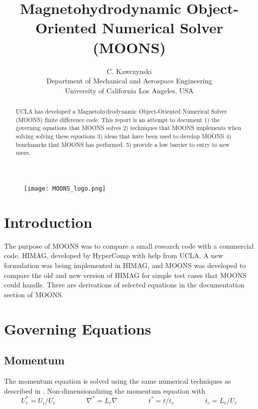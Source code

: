 \documentclass[11pt]{article}
\newcommand{\eqtab}{\;\;\;\;\;\;\;\;\;\;\;\;\;\;\;\;}
\begin{document}
\doublespacing
\begin{figure}
\centering
\texttt{[image: MOONS\_logo.png]}
\end{figure}
\title{Magnetohydrodynamic Object-Oriented Numerical Solver (MOONS)}
\author{C. Kawczynski \\
Department of Mechanical and Aerospace Engineering \\
University of California Los Angeles, USA\\
}
\maketitle

\begin{abstract}
UCLA has developed a Magnetohydrodynamic Object-Oriented Numerical Solver (MOONS) finite difference code. This report is an attempt to document 1) the governing equations that MOONS solves 2) techniques that MOONS implements when solving solving these equations 3) ideas that have been used to develop MOONS 4) benchmarks that MOONS has performed. 5) provide a low barrier to entry to new users.
\end{abstract}

\section{Introduction}
The purpose of MOONS was to compare a small research code with a commercial code, HIMAG, developed by HyperComp with help from UCLA. A new formulation was being implemented in HIMAG, and MOONS was developed to compare the old and new version of HIMAG for simple test cases that MOONS could handle. There are derivations of selected equations in the documentation section of MOONS.

\section{Governing Equations}

\subsection{Momentum}
The momentum equation is solved using the same numerical techniques as described in \cite{griebel1997numerical}.
Non-dimensionalizing the momentum equation with
\begin{equation*}
U_i^* = U_i/U_c  \eqtab
\nabla^* = L_c \nabla \eqtab
t^* = t/t_c  \eqtab
t_c = L_c/U_c
\end{equation*}
\end{document}
